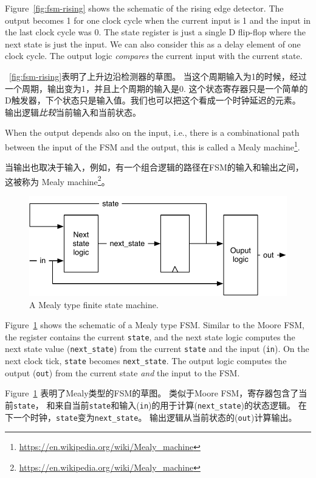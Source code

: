 \documentclass[%
    10pt,
    headinclude, footexclude,
    openright, %
    notitlepage,
    cleardoubleempty,
    headsepline,
    pointlessnumbers,
    bibtotoc, idxtotoc,
    ]{scrbook}
\newcommand{\code}[1]{{\small{\texttt{#1}}}}
\newcommand{\scale}{0.7}
\newcommand{\myref}[2]{\href{#1}{#2}}
\renewcommand{\myref}[2]{{#2}{\footnote{\url{#1}}}}
\begin{document}
{Figure~\ref{fig:fsm-rising} shows the schematic of the rising edge detector.
The output becomes 1 for one clock cycle when the current input is 1
and the input in the last clock cycle was 0.
The state register is just a single D flip-flop where the next state
is just the input. We can also consider this as a delay element of one
clock cycle. The output logic \emph{compares} the current
input with the current state.

~\ref{fig:fsm-rising}表明了上升边沿检测器的草图。
当这个周期输入为1的时候，经过一个周期，输出变为1，并且上个周期的输入是0.
这个状态寄存器只是一个简单的D触发器，下个状态只是输入值。我们也可以把这个看成一个时钟延迟的元素。
输出逻辑\emph{比较}当前输入和当前状态。

When the output depends also on the input, i.e., there is a combinational path between
the input of the FSM and the output, this is called a
\myref{https://en.wikipedia.org/wiki/Mealy_machine}{Mealy machine}.

当输出也取决于输入，例如，有一个组合逻辑的路径在FSM的输入和输出之间，这被称为
\myref{https://en.wikipedia.org/wiki/Mealy_machine}{Mealy machine}。

\begin{figure}
  \centering
  \includegraphics[scale=\scale]{figures/mealy}
  \caption{A Mealy type finite state machine.}
  \label{fig:mealy}
\end{figure}

Figure~\ref{fig:mealy} shows the schematic of a Mealy type FSM.
Similar to the Moore FSM, the register contains the current \code{state}, and
the next state logic computes the next state value (\code{next\_state})
from the current \code{state} and the input (\code{in}).
On the next clock tick, \code{state} becomes \code{next\_state}.
The output logic computes the output (\code{out}) from the current state
\emph{and} the input to the FSM.

Figure~\ref{fig:mealy} 表明了Mealy类型的FSM的草图。
类似于Moore FSM，寄存器包含了当前\code{state}，
和来自当前\code{state}和输入(\code{in})的用于计算(\code{next\_state})的状态逻辑。
在下一个时钟，\code{state}变为\code{next\_state}。
输出逻辑从当前状态的(\code{out})计算输出。


}
\end{document}
